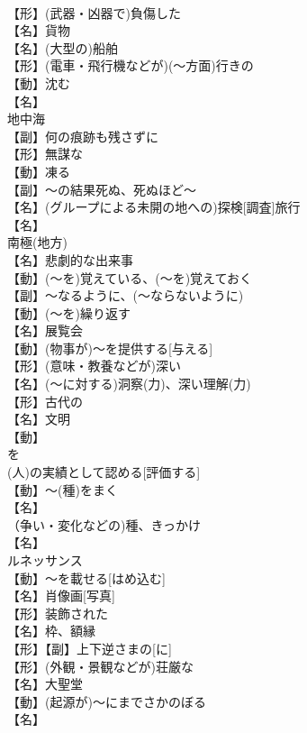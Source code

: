 \documentclass[8pt]{extreport}
\begin{document}
\begin{CJK}{UTF8}{min}
\\	【形】(武器・凶器で)負傷した
\\	【名】貨物
\\	【名】(大型の)船舶
\\	【形】(電車・飛行機などが)(～方面)行きの
\\	【動】沈む
\\	【名】
\\	地中海
\\	【副】何の痕跡も残さずに
\\	【形】無謀な
\\	【動】凍る
\\	【副】～の結果死ぬ、死ぬほど～
\\	【名】(グループによる未開の地への)探検[調査]旅行
\\	【名】
\\	南極(地方)
\\	【名】悲劇的な出来事
\\	【動】(～を)覚えている、(～を)覚えておく
\\	【副】～なるように、(～ならないように)
\\	【動】(～を)繰り返す
\\	【名】展覧会
\\	【動】(物事が)～を提供する[与える]
\\	【形】(意味・教養などが)深い
\\	【名】(～に対する)洞察(力)、深い理解(力)
\\	【形】古代の
\\	【名】文明
\\	【動】
\\	を
\\	(人)の実績として認める[評価する]
\\	【動】～(種)をまく
\\	【名】
\\	（争い・変化などの)種、きっかけ
\\	【名】
\\	ルネッサンス
\\	【動】～を載せる[はめ込む]
\\	【名】肖像画[写真]
\\	【形】装飾された
\\	【名】枠、額縁
\\	【形】【副】上下逆さまの[に]
\\	【形】(外観・景観などが)荘厳な
\\	【名】大聖堂
\\	【動】(起源が)～にまでさかのぼる
\\	【名】

\end{CJK}
\end{document}
